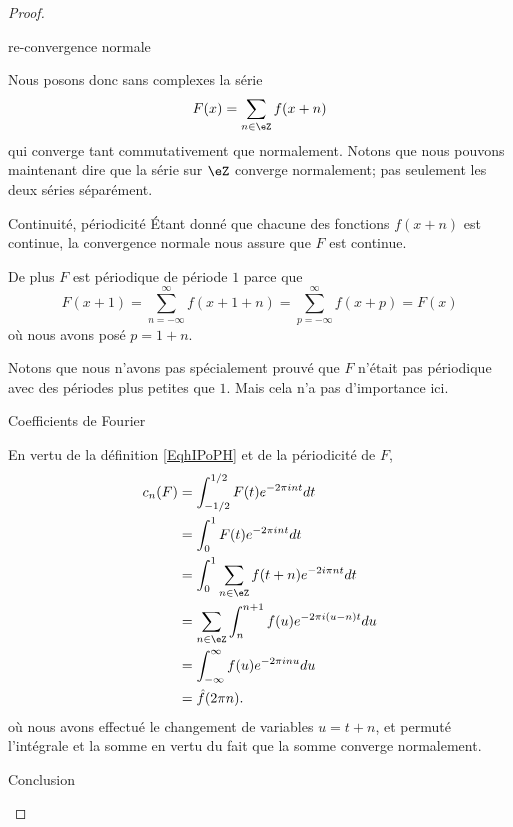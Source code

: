 \begin{proof}
\begin{subproof}
		\item[re-convergence normale]

		Nous posons donc sans complexes la série
		\begin{equation}
			F(x)=\sum_{n\in \eZ}f(x+n)
		\end{equation}
		qui converge tant commutativement que normalement. Notons que nous pouvons maintenant dire que la série sur \( \eZ\) converge normalement; pas seulement les deux séries séparément.

		\item[Continuité, périodicité]
		Étant donné que chacune des fonctions \( f(x+n)\) est continue, la convergence normale nous assure que \( F\) est continue.

		De plus \( F\) est périodique de période \( 1\) parce que
		\begin{equation}
			F(x+1)=\sum_{n=-\infty}^{\infty}f(x+1+n)=\sum_{p=-\infty}^{\infty}f(x+p)=F(x)
		\end{equation}
		où nous avons posé \( p=1+n\).

		Notons que nous n'avons pas spécialement prouvé que \( F\) n'était pas périodique avec des périodes plus petites que \( 1\). Mais cela n'a pas d'importance ici.

		\item[Coefficients de Fourier]

		En vertu de la définition \eqref{EqhIPoPH} et de la périodicité de \( F\),
		\begin{subequations}
			\begin{align}
				c_n(F) & =\int_{-1/2}^{1/2}F(t) e^{-2\pi int}dt                \\
				       & =\int_0^1F(t) e^{-2\pi int}dt                         \\
				       & =\int_0^1\sum_{n\in \eZ}f(t+n) e^{-2 i\pi nt}dt       \\
				       & =\sum_{n\in \eZ}\int_n^{n+1}f(u) e^{-2\pi i (u-n)t}du \\
				       & =\int_{-\infty}^{\infty}f(u) e^{-2\pi inu}du          \\
				       & =\hat f(2\pi n).
			\end{align}
		\end{subequations}
		où nous avons effectué le changement de variables \( u=t+n\), et permuté l'intégrale et la somme en vertu du fait que la somme converge normalement.

		\item[Conclusion]


\end{subproof}
\end{proof}
